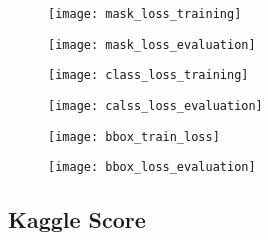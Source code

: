 \begin{figure}[!htb]
\centering
\begin{minipage}{.5\textwidth}
  \centering
  \texttt{[image: mask\_loss\_training]}
  \label{fig:masktrainloss}
\end{minipage}%
\begin{minipage}{.5\textwidth}
  \centering
  \texttt{[image: mask\_loss\_evaluation]}
  \label{fig:maskevaluationloss}
\end{minipage}
\end{figure}

\begin{figure}[!htb]
\centering
\begin{minipage}{.5\textwidth}
  \centering
  \texttt{[image: class\_loss\_training]}
  \label{fig:classtrainloss}
\end{minipage}%
\begin{minipage}{.5\textwidth}
  \centering
  \texttt{[image: calss\_loss\_evaluation]}
  \label{fig:classevaluationloss}
\end{minipage}
\end{figure}

\begin{figure}[!htb]
\centering
\begin{minipage}{.5\textwidth}
  \centering
  \texttt{[image: bbox\_train\_loss]}
  \label{fig:bboxtrainloss}
\end{minipage}%
\begin{minipage}{.5\textwidth}
  \centering
  \texttt{[image: bbox\_loss\_evaluation]}
  \label{fig:bboxevaluationloss}
\end{minipage}
\end{figure}


\newpage
\subsection{Kaggle Score}
\label{subsec:score}

